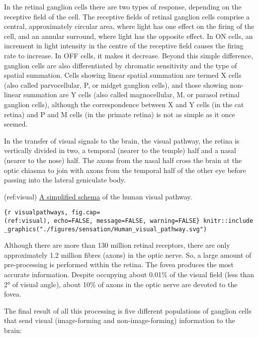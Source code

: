 In the retinal ganglion cells there are two types of response, depending
on the receptive field of the cell. The receptive fields of retinal
ganglion cells comprise a central, approximately circular area, where
light has one effect on the firing of the cell, and an annular surround,
where light has the opposite effect. In ON cells, an increment in light
intensity in the centre of the receptive field causes the firing rate to
increase. In OFF cells, it makes it decrease. Beyond this simple
difference, ganglion cells are also differentiated by chromatic
sensitivity and the type of spatial summation. Cells showing linear
spatial summation are termed X cells (also called parvocellular, P, or
midget ganglion cells), and those showing non-linear summation are Y
cells (also called magnocellular, M, or parasol retinal ganglion cells),
although the correspondence between X and Y cells (in the cat retina)
and P and M cells (in the primate retina) is not as simple as it once
seemed.

In the transfer of visual signals to the brain, the visual pathway, the
retina is vertically divided in two, a temporal (nearer to the temple)
half and a nasal (nearer to the nose) half. The axons from the nasal
half cross the brain at the optic chiasma to join with axons from the
temporal half of the other eye before passing into the lateral
geniculate body.

(ref:visual)
\href{https://commons.m.wikimedia.org/wiki/File:Human_visual_pathway.svg}{A
simplified schema} of the human visual pathway.

\texttt{\{r\ visualpathways,\ fig.cap=\textquotesingle{}(ref:visual)\textquotesingle{},\ echo=FALSE,\ message=FALSE,\ warning=FALSE\}\ knitr::include\_graphics("./figures/sensation/Human\_visual\_pathway.svg")}

Although there are more than 130 million retinal receptors, there are
only approximately 1.2 million fibres (axons) in the optic nerve. So, a
large amount of pre-processing is performed within the retina. The fovea
produces the most accurate information. Despite occupying about 0.01\%
of the visual field (less than 2° of visual angle), about 10\% of axons
in the optic nerve are devoted to the fovea.

The final result of all this processing is five different populations of
ganglion cells that send visual (image-forming and non-image-forming)
information to the brain:

